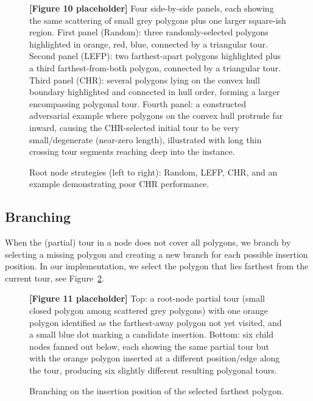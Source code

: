 \documentclass[11pt,a4paper]{article}
\theoremstyle{plain}
\begin{document}
\begin{figure}[h]
\centering
\begin{figplaceholder}
\textbf{[Figure 10 placeholder]} Four side-by-side panels, each showing the same scattering of small grey polygons plus one larger square-ish region. First panel (Random): three randomly-selected polygons highlighted in orange, red, blue, connected by a triangular tour. Second panel (LEFP): two farthest-apart polygons highlighted plus a third farthest-from-both polygon, connected by a triangular tour. Third panel (CHR): several polygons lying on the convex hull boundary highlighted and connected in hull order, forming a larger encompassing polygonal tour. Fourth panel: a constructed adversarial example where polygons on the convex hull protrude far inward, causing the CHR-selected initial tour to be very small/degenerate (near-zero length), illustrated with long thin crossing tour segments reaching deep into the instance.
\end{figplaceholder}
\caption{Root node strategies (left to right): Random, LEFP, CHR, and an example demonstrating poor CHR performance.}
\label{fig:10}
\end{figure}

\subsection{Branching}
\label{sec:3.3}

When the (partial) tour in a node does not cover all polygons, we branch by selecting a missing polygon and creating a new branch for each possible insertion position. In our implementation, we select the polygon that lies farthest from the current tour, see Figure~\ref{fig:11}.

\begin{figure}[h]
\centering
\begin{figplaceholder}
\textbf{[Figure 11 placeholder]} Top: a root-node partial tour (small closed polygon among scattered grey polygons) with one orange polygon identified as the farthest-away polygon not yet visited, and a small blue dot marking a candidate insertion. Bottom: six child nodes fanned out below, each showing the same partial tour but with the orange polygon inserted at a different position/edge along the tour, producing six slightly different resulting polygonal tours.
\end{figplaceholder}
\caption{Branching on the insertion position of the selected farthest polygon.}
\label{fig:11}
\end{figure}
\end{document}
